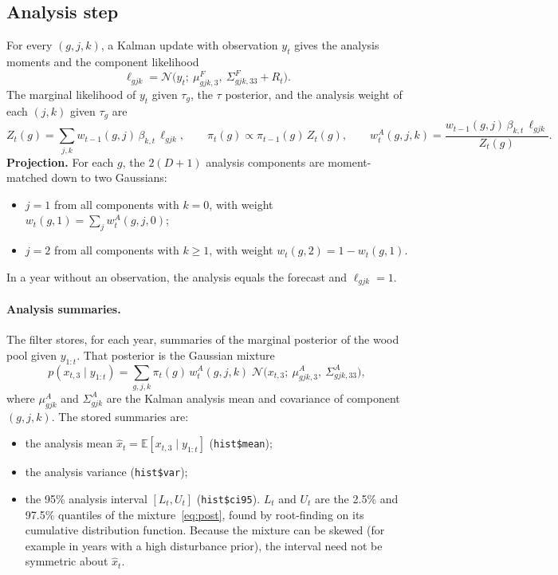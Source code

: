 \documentclass[11pt]{article}
\newcommand{\E}{\mathbb{E}}
\newcommand{\Norm}{\mathcal{N}}
\newcommand{\code}[1]{\texttt{#1}}
\begin{document}
\subsection{Analysis step}

For every $(g,j,k)$, a Kalman update with observation $y_t$ gives the analysis moments
and the component likelihood
\[
  \ell_{gjk} = \Norm\big(y_t;\ \mu^F_{gjk,3},\ \Sigma^F_{gjk,33} + R_t\big).
\]
The marginal likelihood of $y_t$ given $\tau_g$, the $\tau$ posterior, and the analysis
weight of each $(j,k)$ given $\tau_g$ are
\[
  Z_t(g) = \sum_{j,k} w_{t-1}(g,j)\,\beta_{k,t}\,\ell_{gjk}, \qquad
  \pi_t(g) \propto \pi_{t-1}(g)\,Z_t(g), \qquad
  w^A_t(g,j,k) = \frac{w_{t-1}(g,j)\,\beta_{k,t}\,\ell_{gjk}}{Z_t(g)} .
\]
\textbf{Projection.} For each $g$, the $2(D+1)$ analysis components are moment-matched
down to two Gaussians:
\begin{itemize}
  \item $j = 1$ from all components with $k = 0$, with weight
        $w_t(g,1) = \sum_j w^A_t(g,j,0)$;
  \item $j = 2$ from all components with $k \ge 1$, with weight $w_t(g,2) = 1 - w_t(g,1)$.
\end{itemize}
In a year without an observation, the analysis equals the forecast and $\ell_{gjk} = 1$.

\paragraph{Analysis summaries.} The filter stores, for each year, summaries of the
marginal posterior of the wood pool given $y_{1:t}$. That posterior is the Gaussian
mixture
\begin{equation}
  p(x_{t,3} \mid y_{1:t}) = \sum_{g,j,k} \pi_t(g)\, w^A_t(g,j,k)\;
     \Norm\big(x_{t,3};\ \mu^A_{gjk,3},\ \Sigma^A_{gjk,33}\big),
  \label{eq:post}
\end{equation}
where $\mu^A_{gjk}$ and $\Sigma^A_{gjk}$ are the Kalman analysis mean and covariance of
component $(g,j,k)$. The stored summaries are:
\begin{itemize}
  \item the analysis mean $\hat x_t = \E[x_{t,3} \mid y_{1:t}]$ (\code{hist\$mean});
  \item the analysis variance (\code{hist\$var});
  \item the 95\% analysis interval $[L_t, U_t]$ (\code{hist\$ci95}). $L_t$ and $U_t$ are
  the 2.5\% and 97.5\% quantiles of the mixture~\eqref{eq:post}, found by root-finding
  on its cumulative distribution function. Because the mixture can be skewed (for example
  in years with a high disturbance prior), the interval need not be symmetric about
  $\hat x_t$.
\end{itemize}
\end{document}
